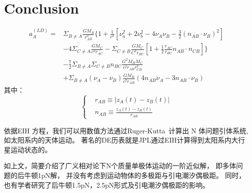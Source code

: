 \documentclass{ctexart}
\begin{document}
\section{Conclusion}
\begin{equation}
  \begin{aligned}
a^{(LD)}_A=&\Sigma_{ B \neq A} \frac{GM_B}{r^2_{AB}}\{1+\frac{1}{c^2}[\nu^2_a+2\nu^2_b-4\nu_A\nu_B-\frac{3}{2}(n_{AB} \cdot \nu_B)^2]\\
&-4 \Sigma_{C \neq A} \frac{GM_C}{c^2r_{AC}}-\Sigma_{C \neq B}\frac{GM_C}{C^2r_{BC}}[1+\frac{1}{2}\frac{r_{AC}}{r_{BC}}n_{AB} \cdot n_{CB}]\}\\
&-\frac{7}{2}\Sigma_{ B \neq A} \Sigma_{ C \neq B}n_{BC}\frac{G^2M_B M_C}{c^2 r_{AB} r_{CB}^2}\\
&+\Sigma_{ B \neq A}(\nu_A-\nu_B)\frac{GM_B}{c^2 r_{AB}}(4 n_{AB} \dot \nu_A- 3 n_{AB} \cdot \nu_B)
  \end{aligned}
\end{equation}
其中：
\begin{equation}
   \left\{
     \begin{aligned}
     &r_{AB}\equiv |z_A(t)-z_B(t)|\\
     &n_{AB}\equiv \frac{z_A(t)-z_B(t)}{r_{AB}}
     \end{aligned}
   \right.
\end{equation}
\par 依据EIH 方程，我们可以用数值方法通过Ruger-Kutta~\cite{Ruger97}计算出 N 体问题引体系统,
如太阳系内的天体运动。
著名的DE历表就是JPL通过EIH计算得到太阳系内大行星运动状态的。
\par 如上文，简要介绍了广义相对论下N个质量单极体运动的一阶近似解，
即多体问题的后牛顿1pN解，
并没有考虑到运动物体的多极距与引电潮汐偶极距。
同时，也有学者研究了后牛顿1.5pN，2.5pN形式及引电潮汐偶极距的影响。


\end{document}
